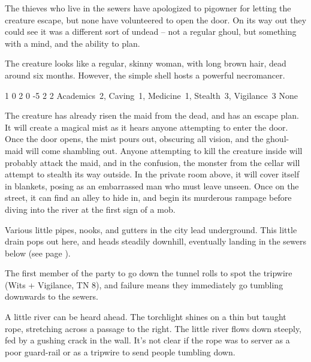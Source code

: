 \begin{multicols}{2}
The thieves who live in the sewers have apologized to \gls{pigowner} for letting the creature escape, but none have volunteered to open the door.
On its way out they could see it was a different sort of undead -- not a regular ghoul, but something with a mind, and the ability to plan.

The creature looks like a regular, skinny woman, with long brown hair, dead around six months.
However, the simple shell hosts a powerful necromancer.


  {1}%
  {0}%
  {{2}%
  {0}%
  {-5}}%
  {2}%
  {2}%
  {Academics~2, Caving~1, Medicine~1, Stealth~3, Vigilance~3
  }%
  {None}%
  {}

The creature has already risen the maid from the dead, and has an escape plan.
It will create a magical mist as it hears anyone attempting to enter the door.
Once the door opens, the mist pours out, obscuring all vision, and the ghoul-maid will come shambling out.
Anyone attempting to kill the creature inside will probably attack the maid, and in the confusion, the monster from the cellar will attempt to stealth its way outside.
In the private room above, it will cover itself in blankets, posing as an embarrassed man who must leave unseen.
Once on the street, it can find an alley to hide in, and begin its murderous rampage before diving into the river at the first sign of a mob.



Various little pipes, nooks, and gutters in the city lead underground.
This little drain pops out here, and heads steadily downhill, eventually landing in the sewers below (see page \pageref{slidein}).

The first member of the party to go down the tunnel rolls to spot the tripwire (Wits + Vigilance, TN 8), and failure means they immediately go tumbling downwards to the sewers.

\begin{boxtext}

  A little river can be heard ahead.
  The torchlight shines on a thin but taught rope, stretching across a passage to the right.
  The little river flows down steeply, fed by a gushing crack in the wall.
  It's not clear if the rope was to server as a poor guard-rail or as a tripwire to send people tumbling down.


\end{boxtext}
\end{multicols}
